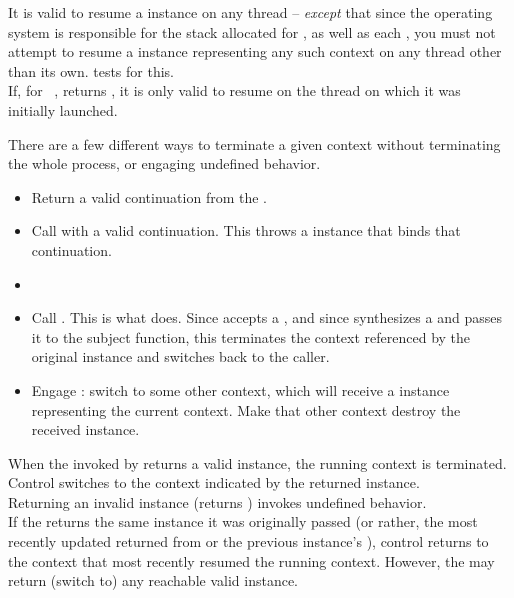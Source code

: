 It is valid to resume a \cont instance on any thread -- \emph{except} that
since the operating system is responsible for the stack allocated for \main,
as well as each , you must not attempt to resume a \cont
instance representing any such context on any thread other
than its own. \anythread tests for this.\\

If, for \cont\ ,  returns , it is
only valid to resume  on the thread on which it was initially
launched.


There are a few different ways to terminate a given context without
terminating the whole process, or engaging undefined behavior.

\begin{itemize}
\item Return a valid continuation from the \entryfn.
\item Call \unwindcont with a valid continuation. This throws a \unwindex
instance that binds that continuation.
\item {}
\item
Call .
This is what \dtor does. Since \unwindcont accepts a \cont, and
since \resumewith synthesizes a \cont and passes it to the subject function,
this terminates the context referenced by the original \cont instance and
switches back to the caller.
\item Engage \dtor: switch to some other context, which will
receive a \cont instance representing the current context. Make that other
context destroy the received \cont instance.
\end{itemize}

When the \entryfn invoked by \callcc returns a valid \cont instance,
the running context is terminated. Control switches to the context
indicated by the returned \cont instance.\\

Returning an invalid \cont instance (\opbool returns ) invokes
undefined behavior.\\

If the \entryfn returns the same \cont instance it was originally
passed (or rather, the most recently updated \cont returned from \callcc or the
previous instance's \resume), control returns to the context that most
recently resumed the running context. However, the \entryfn may return (switch
to) any reachable valid \cont instance.\\

